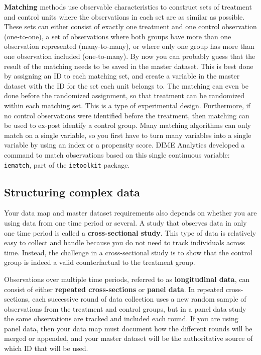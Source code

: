 \textbf{Matching}
methods use observable characteristics to construct
sets of treatment and control units
where the observations in each set 
are as similar as possible. 
These sets can either consist of exactly one treatment and one control observation (one-to-one),
a set of observations where
both groups have more than one observation represented (many-to-many),
or where only one group has more than one observation included (one-to-many).
By now you can probably guess that 
the result of the matching needs to be saved in the master dataset.
This is best done by assigning an ID to each matching set, 
and create a variable in the master dataset 
with the ID for the set each unit belongs to.
The matching can even be done before the randomized assignment,
so that treatment can be randomized within each matching set.
This is a type of experimental design.
Furthermore, if no control observations were identified before the treatment,
then matching can be used to ex-post identify a control group.
Many matching algorithms can only match on a single variable,
so you first have to turn many variables into a single variable
by using an index or a propensity score.
DIME Analytics developed a command to match observations 
based on this single continuous variable: \texttt{iematch},
part of the \texttt{ietoolkit} package.

\subsection{Structuring complex data}

Your data map and master dataset requirements also depends on
whether you are using data from one time period or several.
A study that observes data in only one time period is called
a \textbf{cross-sectional study}.
This type of data is relatively easy to collect and handle because
you do not need to track individuals across time.
Instead, the challenge in a cross-sectional study is to
show that the control group is indeed a valid counterfactual to the treatment group.

Observations over multiple time periods, 
referred to as \textbf{longitudinal data},
can consist of either \textbf{repeated cross-sections}
or \textbf{panel data}.
In repeated cross-sections,
each successive round of data collection uses a new random sample
of observations from the treatment and control groups,
but in a panel data study the same observations are tracked and included each round.
If you are using panel data,
then your data map must document how the different rounds will be merged or appended,
and your master dataset will be the authoritative source of which ID that will be used. 

